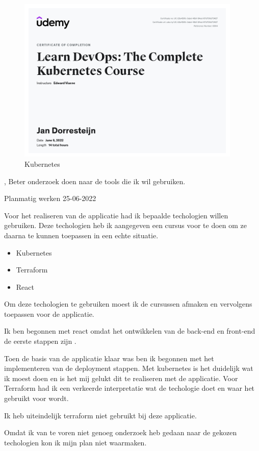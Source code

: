 {{\begin{figure}[H]
\begin{center}
				\includegraphics[width=0.95\textwidth]{images/kube.jpg}
			\end{center}
			\caption{Kubernetes}
			\label{fig:kubernets}
		\end{figure}

	},
	\bewijs
	{%
		Beter onderzoek doen naar de tools die ik wil gebruiken.
	}
	{%
		\starr
		{%
			Planmatig werken
		}
		{%
			25-06-2022
		}
		{%
			Voor het realiseren van de applicatie had ik bepaalde techologien willen gebruiken.
			Deze techologien heb ik aangegeven een cursus voor te doen om ze daarna te kunnen toepassen in een echte situatie.
			\begin{itemize}
				\item Kubernetes
				\item Terraform
				\item React
			\end{itemize}
		}
		{%
			Om deze techologien te gebruiken moest ik de cursussen afmaken en vervolgens toepassen voor de applicatie.
		}
		{%
			Ik ben begonnen met react omdat het ontwikkelen van de back-end en front-end de eerste stappen zijn .

			Toen de basis van de applicatie klaar was ben ik begonnen met het implementeren van de deployment stappen.
			Met kubernetes is het duidelijk wat ik moest doen en is het mij gelukt dit te realiseren met de applicatie.
			Voor Terraform had ik een verkeerde interpretatie wat de techologie doet en waar het gebruikt voor wordt.

			Ik heb uiteindelijk terraform niet gebruikt bij deze applicatie.

		}
		{%
			Omdat ik van te voren niet genoeg onderzoek heb gedaan naar de gekozen techologien kon ik mijn plan niet waarmaken.

}}}
